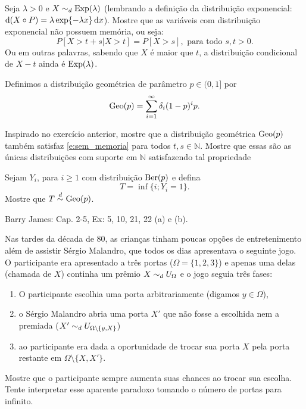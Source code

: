 \begin{exercise}
  Seja $\lambda > 0$ e $X \sim_d \operatorname{Exp}(\lambda)$ (lembrando a definição da distribuição exponencial: $\mathop{}\!\mathrm{d} (X \circ P) = \lambda \exp\{- \lambda x\} \mathop{}\!\mathrm{d} x$).
  Mostre que as variáveis com distribuição exponencial não possuem memória, ou seja:
  \begin{equation}
    \label{e:sem_memoria}
    P[X > t + s | X > t] = P [X > s], \text{ para todo $s, t > 0$}.
  \end{equation}
  Ou em outras palavras, sabendo que $X$ é maior que $t$, a distribuição condicional de $X - t$ ainda é $\operatorname{Exp}(\lambda)$.
\end{exercise}

Definimos a distribuição geométrica  de parâmetro $p \in (0,1]$ por
\begin{equation}
  \operatorname{Geo}(p) = \sum_{i = 1}^\infty \delta_i (1-p)^i p.
\end{equation}

\begin{exercise}
  Inspirado no exercício anterior, mostre que a distribuição geométrica $\operatorname{Geo}(p)$ também satisfaz \eqref{e:sem_memoria} para todos $t, s \in \mathbb{N}$.
  Mostre que essas são as únicas distribuições com suporte em $\mathbb{N}$ satisfazendo tal propriedade
\end{exercise}

\begin{exercise}
  \label{x:geo_time}
  Sejam $Y_i$, para $i \geq 1$ \iid com distribuição $\operatorname{Ber}(p)$ e defina
  \begin{equation}
    T = \inf\{i; Y_i = 1\}.
  \end{equation}
  Mostre que $T \overset{d}\sim \operatorname{Geo}(p)$.
\end{exercise}

\begin{exercise}
  Barry James: Cap. 2-5, Ex: 5, 10, 21, 22 (a) e (b).
\end{exercise}

\begin{exercise}
  Nas tardes da década de 80, as crianças tinham poucas opções de entretenimento além de assistir Sérgio Malandro, que todos os dias apresentava o seguinte jogo.
  O participante era apresentado a três portas ($\Omega = \{1,2,3\}$) e apenas uma delas (chamada de $X$) continha um prêmio $X \sim_d U_{\Omega}$ e o jogo seguia três fases:
  \begin{enumerate}[\quad a)]
  \item O participante escolhia uma porta arbitrariamente (digamos $y \in \Omega$),
  \item o Sérgio Malandro abria uma porta $X'$ que não fosse a escolhida nem a premiada ($X' \sim_d U_{\Omega \setminus \{y, X\}}$)
  \item ao participante era dada a oportunidade de trocar sua porta $X$ pela porta restante em $\Omega \setminus \{X, X'\}$.
  \end{enumerate}
  Mostre que o participante sempre aumenta suas chances ao trocar sua escolha.
  Tente interpretar esse aparente paradoxo tomando o número de portas para infinito.
\end{exercise}

